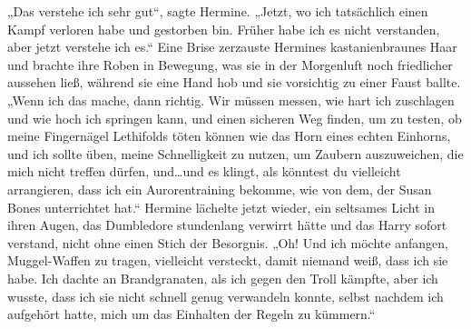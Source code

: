 „Das verstehe ich sehr gut“, sagte Hermine. „Jetzt, wo ich tatsächlich einen Kampf verloren habe und gestorben bin. Früher habe ich es nicht verstanden, aber jetzt verstehe ich es.“
Eine Brise zerzauste Hermines kastanienbraunes Haar und brachte ihre Roben in Bewegung, was sie in der Morgenluft noch friedlicher aussehen ließ, während sie eine Hand hob und sie vorsichtig zu einer Faust ballte.
„Wenn ich das mache, dann richtig. Wir müssen messen, wie hart ich zuschlagen und wie hoch ich springen kann, und einen sicheren Weg finden, um zu testen, ob meine Fingernägel Lethifolds töten können wie das Horn eines echten Einhorns, und ich sollte üben, meine Schnelligkeit zu nutzen, um Zaubern auszuweichen, die mich nicht treffen dürfen, und…und es klingt, als könntest du vielleicht arrangieren, dass ich ein Aurorentraining bekomme, wie von dem, der Susan Bones unterrichtet hat.“
Hermine lächelte jetzt wieder, ein seltsames Licht in ihren Augen, das Dumbledore stundenlang verwirrt hätte und das Harry sofort verstand, nicht ohne einen Stich der Besorgnis.
„Oh! Und ich möchte anfangen, Muggel-Waffen zu tragen, vielleicht versteckt, damit niemand weiß, dass ich sie habe. Ich dachte an Brandgranaten, als ich gegen den Troll kämpfte, aber ich wusste, dass ich sie nicht schnell genug verwandeln konnte, selbst nachdem ich aufgehört hatte, mich um das Einhalten der Regeln zu kümmern.“

